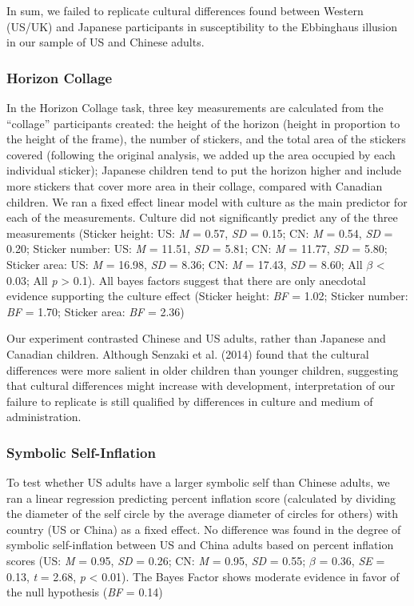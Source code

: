 \documentclass[
  man]{apa6}
\begin{document}
In sum, we failed to replicate cultural differences found between Western (US/UK) and Japanese participants in susceptibility to the Ebbinghaus illusion in our sample of US and Chinese adults.

\hypertarget{horizon-collage-1}{%
\subsubsection{Horizon Collage}\label{horizon-collage-1}}

In the Horizon Collage task, three key measurements are calculated from the ``collage'' participants created: the height of the horizon (height in proportion to the height of the frame), the number of stickers, and the total area of the stickers covered (following the original analysis, we added up the area occupied by each individual sticker); Japanese children tend to put the horizon higher and include more stickers that cover more area in their collage, compared with Canadian children. We ran a fixed effect linear model with culture as the main predictor for each of the measurements. Culture did not significantly predict any of the three measurements (Sticker height: US: \emph{M} = 0.57, \emph{SD} = 0.15; CN: \emph{M} = 0.54, \emph{SD} = 0.20; Sticker number: US: \emph{M} = 11.51, \emph{SD} = 5.81; CN: \emph{M} = 11.77, \emph{SD} = 5.80; Sticker area: US: \emph{M} = 16.98, \emph{SD} = 8.36; CN: \emph{M} = 17.43, \emph{SD} = 8.60; All \(\beta\) \textless{} 0.03; All \emph{p} \textgreater{} 0.1). All bayes factors suggest that there are only anecdotal evidence supporting the culture effect (Sticker height: \emph{BF} = 1.02; Sticker number: \emph{BF} = 1.70; Sticker area: \emph{BF} = 2.36)

Our experiment contrasted Chinese and US adults, rather than Japanese and Canadian children. Although Senzaki et al. (2014) found that the cultural differences were more salient in older children than younger children, suggesting that cultural differences might increase with development, interpretation of our failure to replicate is still qualified by differences in culture and medium of administration.

\hypertarget{symbolic-self-inflation-1}{%
\subsubsection{Symbolic Self-Inflation}\label{symbolic-self-inflation-1}}

To test whether US adults have a larger symbolic self than Chinese adults, we ran a linear regression predicting percent inflation score (calculated by dividing the diameter of the self circle by the average diameter of circles for others) with country (US or China) as a fixed effect. No difference was found in the degree of symbolic self-inflation between US and China adults based on percent inflation scores (US: \emph{M} = 0.95, \emph{SD} = 0.26; CN: \emph{M} = 0.95, \emph{SD} = 0.55; \(\beta\) = 0.36, \emph{SE} = 0.13, \emph{t} = 2.68, \emph{p} \textless{} 0.01). The Bayes Factor shows moderate evidence in favor of the null hypothesis (\emph{BF} = 0.14)
\end{document}
